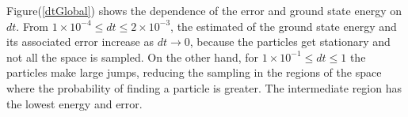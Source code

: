 Figure(\ref{dtGlobal}) shows the dependence of the error and ground state energy on $dt$. From $1\times 10^{-4} \leq dt \leq 2\times 10^{-3}$, the estimated of the ground state energy and its associated error increase as $dt \rightarrow 0$, because the particles get stationary and not all the space is sampled. On the other hand,  for $1\times 10^{-1} \leq dt \leq 1$ the particles make large jumps, reducing the sampling in the regions of the space where the probability of finding a particle is greater. The intermediate region has the lowest energy and error.\\





